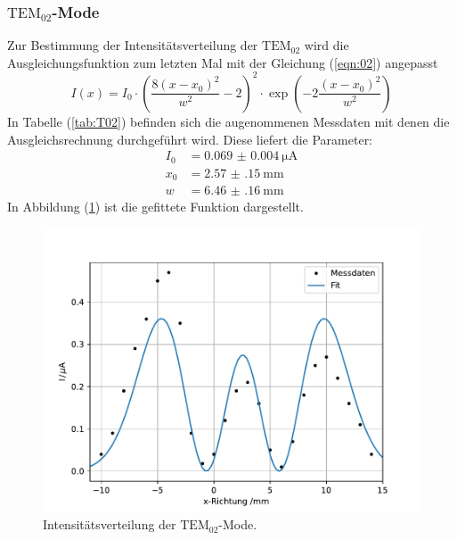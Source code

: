 \subsubsection{$\text{TEM}_{02}$-Mode}

Zur Bestimmung der Intensitätsverteilung der $\mathrm{TEM}_\mathrm{02}$ wird die Ausgleichungsfunktion zum letzten Mal mit der Gleichung (\ref{eqn:02}) angepasst
\begin{equation}
  I(x) = I_\mathrm{0} \cdot \left(\frac{8(x-x_\mathrm{0})^2}{w^2}-2\right)^2 \cdot \exp\left(-2\frac{(x-x_\mathrm{0})^2}{w^2}\right)
\end{equation}
In Tabelle (\ref{tab:T02}) befinden sich die augenommenen Messdaten mit denen die Ausgleichsrechnung durchgeführt wird.
Diese liefert die Parameter:
\begin{align*}
I_\mathrm{0} &= \SI{0.069(4)}{\micro\ampere}\\
x_\mathrm{0} &= \SI{2.57(15)}{\milli\meter}\\
w &= \SI{6.46(16)}{\milli\meter}
\end{align*}
In Abbildung (\ref{fig:T02}) ist die gefittete Funktion dargestellt.

\begin{figure}[h!]
  \centering
  \includegraphics[scale=0.7]{fig/plot4.pdf}
  \caption{Intensitätsverteilung der $\mathrm{TEM}_\mathrm{02}$-Mode.}
  \label{fig:T02}
\end{figure}


